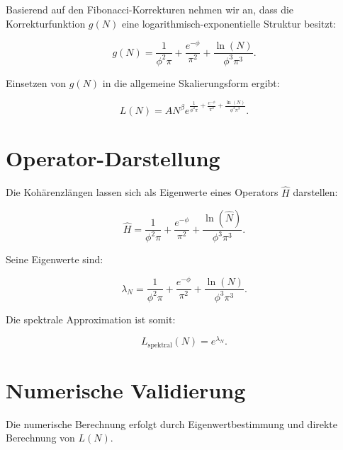 \documentclass[a4paper,12pt]{article}
\begin{document}
Basierend auf den Fibonacci-Korrekturen nehmen wir an, dass die Korrekturfunktion \( g(N) \) eine logarithmisch-exponentielle Struktur besitzt:

\begin{equation}
    g(N) = \frac{1}{\phi^2 \pi} + \frac{e^{-\phi}}{\pi^2} + \frac{\ln(N)}{\phi^3 \pi^3}.
\end{equation}

Einsetzen von \( g(N) \) in die allgemeine Skalierungsform ergibt:

\begin{equation}
    L(N) = A N^\beta e^{\frac{1}{\phi^2 \pi} + \frac{e^{-\phi}}{\pi^2} + \frac{\ln(N)}{\phi^3 \pi^3}}.
\end{equation}

\section{Operator-Darstellung}
Die Kohärenzlängen lassen sich als Eigenwerte eines Operators \( \hat{H} \) darstellen:

\begin{equation}
    \hat{H} = \frac{1}{\phi^2 \pi} + \frac{e^{-\phi}}{\pi^2} + \frac{\ln(\hat{N})}{\phi^3 \pi^3}.
\end{equation}

Seine Eigenwerte sind:

\begin{equation}
    \lambda_N = \frac{1}{\phi^2 \pi} + \frac{e^{-\phi}}{\pi^2} + \frac{\ln(N)}{\phi^3 \pi^3}.
\end{equation}

Die spektrale Approximation ist somit:

\begin{equation}
    L_{\text{spektral}}(N) = e^{\lambda_N}.
\end{equation}

\section{Numerische Validierung}
Die numerische Berechnung erfolgt durch Eigenwertbestimmung und direkte Berechnung von \( L(N) \).
\end{document}
